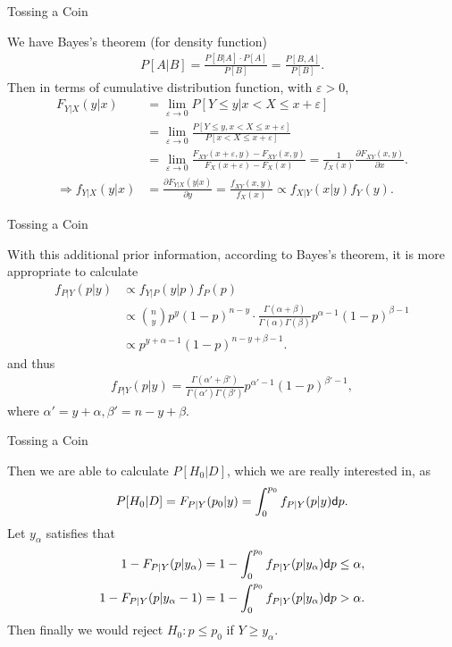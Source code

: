 \begin{frame}{Tossing a Coin}

\justifying
{} We have Bayes's theorem (for density function)
\begin{align*}
P[A|B] = \frac{P[B|A]\cdot P[A]}{P[B]} = \frac{P[B, A]}{P[B]}.
\end{align*}
Then in terms of cumulative distribution function, with $\varepsilon > 0$,
\begin{align*}
F_{Y|X}(y|x) & = \lim_{\varepsilon \rightarrow 0} P[Y\leq y|x < X \leq x + \varepsilon] \\
& = \lim_{\varepsilon \rightarrow 0} \frac{P[Y\leq y, x < X \leq x + \varepsilon]}{P[x < X \leq x + \varepsilon]} \\
& = \lim_{\varepsilon \rightarrow 0} \frac{F_{XY}(x + \varepsilon, y) - F_{XY}(x, y)}{F_X(x+\varepsilon) - F_X(x)} = \frac{1}{f_X(x)}\frac{\partial F_{XY}(x, y)}{\partial x}. \\
\Rightarrow f_{Y|X}(y|x) & = \frac{\partial F_{Y|X}(y|x)}{\partial y} = \frac{f_{XY}(x, y)}{f_X(x)} \propto f_{X|Y}(x|y) f_Y(y).
\end{align*}

\end{frame}


\begin{frame}{Tossing a Coin}

\justifying
{} With this additional prior information, according to Bayes's theorem, it is more appropriate to calculate
\begin{align*}
f_{P|Y}(p|y) & \propto f_{Y|P}(y|p)f_P(p) \\
& \propto \binom{n}{y} p^y(1-p)^{n-y} \cdot\frac{\Gamma(\alpha + \beta)}{\Gamma(\alpha)\Gamma(\beta)}p^{\alpha-1}(1 - p)^{\beta-1} \\
& \propto p^{y+\alpha-1} (1-p)^{n-y+\beta-1}.
\end{align*}
and thus
\begin{align*}
f_{P|Y}(p|y) = \frac{\Gamma(\alpha' + \beta')}{\Gamma(\alpha')\Gamma(\beta')}p^{\alpha'-1}(1 - p)^{\beta'-1},
\end{align*}
where $\alpha' = y + \alpha, \beta' = n - y + \beta$.

\end{frame}

\begin{frame}{Tossing a Coin}

\justifying
{} Then we are able to calculate $P[H_0|D]$, which we are really interested in, as
\begin{align*}
P[H_0|D] = F_{P|Y}(p_0|y) = \int_0^{p_0} f_{P|Y}(p|y) \mathsf{d}p.
\end{align*}
Let $y_{\alpha}$ satisfies that
\begin{align*}
1 - F_{P|Y}(p|y_{\alpha}) & = 1 - \int_0^{p_{0}} f_{P|Y}(p|y_{\alpha}) \mathsf{d}p \leq \alpha,\\
1 - F_{P|Y}(p|y_{\alpha}-1) & = 1 - \int_0^{p_{0}} f_{P|Y}(p|y_{\alpha}) \mathsf{d}p > \alpha.
\end{align*}
Then finally we would reject $H_0: p\leq p_0$ if $Y\geq y_{\alpha}$. 

\end{frame}


